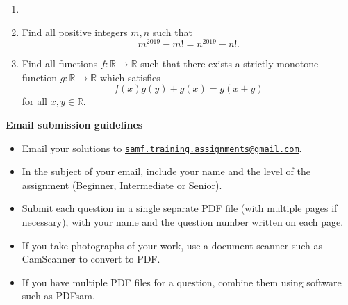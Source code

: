 \documentclass{article}
\begin{document}
\begin{enumerate}[1.]
\vspace{6pt}
\item


\vspace{6pt}
\item %
Find all positive integers $m, n$ such that
\[ m^{2019} - m! = n^{2019} - n! . \]


\vspace{6pt}
\item %
Find all functions $f : \mathbb{R} \to \mathbb{R}$ such that there exists a strictly monotone function $g : \mathbb{R} \to \mathbb{R}$ which satisfies
\[ f(x)g(y) + g(x) = g(x+y) \]
for all $x, y \in \mathbb{R}$.

\end{enumerate}


\vfill
\textbf{\Large Email submission guidelines}
\begin{itemize}
	\item Email your solutions to \href{mailto:samf.training.assignments@gmail.com}{\texttt{samf.training.assignments@gmail.com}}.
	\item In the subject of your email, include your name and the level of the assignment (Beginner, Intermediate or Senior).
	\item Submit each question in a single separate PDF file (with multiple pages if necessary), with your name and the question number written on each page.
	\item If you take photographs of your work, use a document scanner such as CamScanner to convert to PDF.
	\item If you have multiple PDF files for a question, combine them using software such as PDFsam.
\end{itemize}
\end{document}
